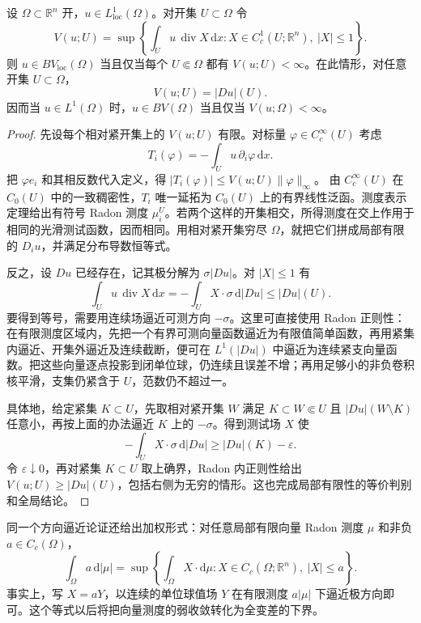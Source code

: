 \begin{proposition}\label{g3:prop:bv-dual-variation}
	设 \(\Omega\subset\mathbb R^n\) 开，\(u\in L^1_{\mathrm{loc}}(\Omega)\)。对开集 \(U\subset\Omega\) 令
	\begin{equation}\label{g3:eq:bv-dual-variation}
		V(u;U)=\sup\left\{
		\int_Uu\,\operatorname{div}X\,\mathrm dx:
		X\in C_c^1(U;\mathbb R^n),\ |X|\le1\right\}.
	\end{equation}
	则 \(u\in BV_{\mathrm{loc}}(\Omega)\) 当且仅当每个 \(U\Subset\Omega\) 都有 \(V(u;U)<\infty\)。在此情形，对任意开集 \(U\subset\Omega\)，
	\[
		V(u;U)=|Du|(U).
	\]
	因而当 \(u\in L^1(\Omega)\) 时，\(u\in BV(\Omega)\) 当且仅当 \(V(u;\Omega)<\infty\)。
\end{proposition}
\begin{proof}
	先设每个相对紧开集上的 \(V(u;U)\) 有限。对标量 \(\varphi\in C_c^\infty(U)\) 考虑
	\[
		T_i(\varphi)=-\int_Uu\,\partial_i\varphi\,\mathrm dx.
	\]
	把 \(\varphi e_i\) 和其相反数代入定义，得
	\(|T_i(\varphi)|\le V(u;U)\|\varphi\|_\infty\)。
	由 \(C_c^\infty(U)\) 在 \(C_0(U)\) 中的一致稠密性，\(T_i\) 唯一延拓为 \(C_0(U)\) 上的有界线性泛函。测度表示定理给出有符号 Radon 测度 \(\mu_i^U\)。若两个这样的开集相交，所得测度在交上作用于相同的光滑测试函数，因而相同。用相对紧开集穷尽 \(\Omega\)，就把它们拼成局部有限的 \(D_i u\)，并满足分布导数恒等式。

	反之，设 \(Du\) 已经存在，记其极分解为 \(\sigma|Du|\)。对 \(|X|\le1\) 有
	\[
		\int_Uu\,\operatorname{div}X\,\mathrm dx
		=-\int_UX\cdot\sigma\,\mathrm d|Du|
		\le|Du|(U).
	\]
	要得到等号，需要用连续场逼近可测方向 \(-\sigma\)。这里可直接使用 Radon 正则性：在有限测度区域内，先把一个有界可测向量函数逼近为有限值简单函数，再用紧集内逼近、开集外逼近及连续截断，便可在 \(L^1(|Du|)\) 中逼近为连续紧支向量函数。把这些向量逐点投影到闭单位球，仍连续且误差不增；再用足够小的非负卷积核平滑，支集仍紧含于 \(U\)，范数仍不超过一。

	具体地，给定紧集 \(K\subset U\)，先取相对紧开集 \(W\) 满足 \(K\subset W\Subset U\) 且 \(|Du|(W\setminus K)\) 任意小，再按上面的办法逼近 \(K\) 上的 \(-\sigma\)。得到测试场 \(X\) 使
	\[
		-\int_UX\cdot\sigma\,\mathrm d|Du|
		\ge |Du|(K)-\varepsilon.
	\]
	令 \(\varepsilon\downarrow0\)，再对紧集 \(K\subset U\) 取上确界，Radon 内正则性给出 \(V(u;U)\ge|Du|(U)\)，包括右侧为无穷的情形。这也完成局部有限性的等价判别和全局结论。
\end{proof}

同一个方向逼近论证还给出加权形式：对任意局部有限向量 Radon 测度 \(\mu\) 和非负 \(a\in C_c(\Omega)\)，
\begin{equation}\label{g3:eq:weighted-vector-measure-duality}
	\int_\Omega a\,\mathrm d|\mu|
	=\sup\left\{\int_\Omega X\cdot\mathrm d\mu:
	X\in C_c(\Omega;\mathbb R^n),\ |X|\le a\right\}.
\end{equation}
事实上，写 \(X=aY\)，以连续的单位球值场 \(Y\) 在有限测度 \(a|\mu|\) 下逼近极方向即可。这个等式以后将把向量测度的弱收敛转化为全变差的下界。


